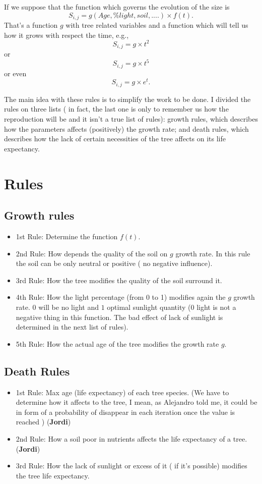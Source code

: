 \documentclass [12pt]{article}
\begin{document}
\noindent
If we suppose that the function which governs the evolution of the size is $$S_{i,j}=g\left( Age,\% light, soil, .... \right)\times f(t) .$$ That's a function $g$ with tree related variables and a function which will tell us how it grows with respect the time, e.g., $$S_{i,j}=g\times t^2$$ or $$S_{i,j}=g\times t^5$$ or even $$S_{i,j}=g\times e^t.$$


The main idea with these rules is to simplify the work to be done.  I divided  the rules on three lists ( in fact, the last one is only to remember us how the reproduction will be and it isn't a true list of rules): growth rules, which describes how the parameters affects (positively) the growth rate; and  death rules, which describes how the lack of certain necessities of the tree affects on its life expectancy. 
\section*{Rules}
\subsection*{Growth rules}
\begin{itemize}
\item 1st Rule: Determine the function $f(t)$.
\item 2nd Rule: How depends the quality of the soil on $g$ growth rate. In this rule the soil can be only neutral or positive ( no negative influence).
\item 3rd Rule: How the tree modifies the quality of the soil surround it.
\item 4th Rule: How the light percentage (from 0 to 1)  modifies again the $g$ growth rate. $0$ will be no light and $1$ optimal sunlight quantity (0 light is not a negative thing  in this function. The bad effect of lack of sunlight is determined in the next list of rules).
\item 5th Rule: How the actual age of the tree modifies the growth  rate $g$.
\end{itemize}

\subsection*{Death Rules}
\begin{itemize}
\item 1st Rule:  Max age (life expectancy) of each tree species. (We have to determine how it affects to the tree, I mean, as Alejandro told me, it could be in form of a  probability of disappear in each iteration once the value is reached ) (\textbf{Jordi})
\item 2nd Rule: How a soil poor in nutrients  affects the  life expectancy of a tree.  (\textbf{Jordi})
\item 3rd Rule: How the lack of sunlight or excess of it ( if it's possible) modifies the tree life expectancy.
\end{itemize}
\end{document}
